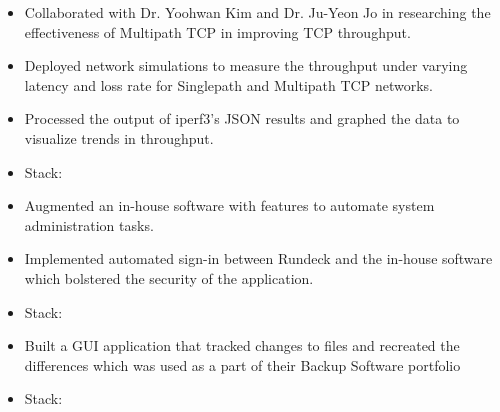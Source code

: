     

\begin{itemize}
    \item Collaborated with Dr. Yoohwan Kim and Dr. Ju-Yeon Jo in researching the effectiveness of Multipath TCP in improving TCP throughput.
    \item Deployed network simulations to measure the throughput under varying latency and loss rate for Singlepath and Multipath TCP networks.
    \item Processed the output of iperf3's JSON results and graphed the data to visualize trends in throughput.
    \item Stack:    
\end{itemize}
\divider

\begin{itemize}
    \item Augmented an in-house software with features to automate system administration tasks.
    \item Implemented automated sign-in between Rundeck and the in-house software which bolstered the security of the application.
    \item Stack:  
\end{itemize}

\divider

\begin{itemize}
    \item Built a GUI application that tracked changes to files and recreated the differences which was used as a part of their Backup Software portfolio 
    \item Stack:   
\end{itemize}

\divider

